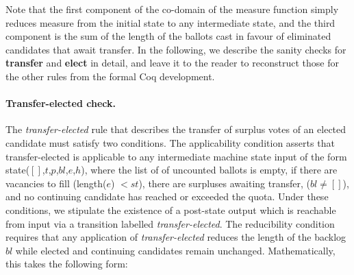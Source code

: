 \documentclass{llncs}
\begin{document}
\noindent
Note that the first component of the co-domain of the measure
function simply reduces measure from the initial state to any
intermediate state, and the third component is the sum of the length
of the ballots cast in favour of eliminated candidates that await
transfer. In the following, we describe
the sanity checks for \textbf{transfer} and \textbf{elect} in detail, 
and leave it to the reader to reconstruct those for the other rules
from the formal Coq development.

\paragraph{Transfer-elected check.} The
\emph{transfer-elected}  rule that describes the transfer
of surplus votes of an elected candidate 
must satisfy two conditions. The applicability condition
asserts that transfer-elected is applicable to 
any intermediate machine state \textsf{input} of the
form \textsf{state}($[]$,$t$,$p$,$bl$,$e$,$h$), where the list of of
uncounted ballots is empty, if there are vacancies to fill
(\textsf{length}($e$) $< st$), there are surpluses awaiting transfer,
($bl \neq []$), and no continuing candidate has reached or
exceeded the quota. Under these conditions, we stipulate the
existence of a post-state 
\textsf{output} which is reachable from \textsf{input} via a
transition labelled \emph{transfer-elected}. 
The reducibility condition requires that any application of
\emph{transfer-elected} reduces the length of the backlog
$\mathit{bl}$ while elected and continuing candidates remain
unchanged.  Mathematically, this takes the following form:
\end{document}
